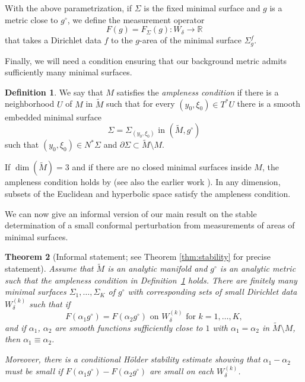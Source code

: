 \documentclass[11pt]{amsart}
\newtheorem{Theorem}{Theorem}[section]
\theoremstyle{definition}
\newtheorem{Definition}[Theorem]{Definition}
\numberwithin{equation}{section}
\newcommand{\mR}{\mathbb{R}}                    %
\newcommand{\p}{\partial}
\begin{document}
With the above parametrization, if $\Sigma$ is the fixed minimal surface and ${g}$ is a metric close to ${g}^{\circ}$, we define the measurement operator 
\begin{equation} \label{intro_f_def}
F({g}) = F_{\Sigma}({g}): W_{\delta} \to \mR
\end{equation}
that takes a Dirichlet data $f$ to the $g$-area of the minimal surface $\Sigma_{{g}}^f$.

Finally, we will need a condition ensuring that our background metric admits sufficiently many minimal surfaces.

\begin{Definition}\label{def:ampleness}
We say that $M$ satisfies the \emph{ampleness condition} if there is a neighborhood $U$ of $M$ in $\widetilde{M}$ such that for every $(y_0,\xi_0) \in T^\ast U$ there is a smooth embedded minimal surface
$$\Sigma=\Sigma_{(y_0,\xi_0)} \text{ in $(\widetilde{M},{g}^\circ)$}$$ 
such that $(y_0,\xi_0) \in N^\ast\Sigma$ and $\p \Sigma \subset \widetilde{M} \setminus M$.
\end{Definition}

If $\dim(\widetilde{M}) = 3$ and if there are no closed minimal surfaces inside $M$, the ampleness condition holds by \cite{mazet2022minimal} (see also the earlier work \cite{zbMATH06945887}). In any dimension, subsets of the Euclidean and hyperbolic space satisfy the ampleness condition.

We can now give an informal version of our main result on the stable determination of a small conformal perturbation from measurements of areas of minimal surfaces.

\begin{Theorem}[Informal statement; see Theorem \ref{thm:stability} for precise statement] \label{thm:rigidity_intro}
	Assume that $\widetilde M$ is an analytic manifold and ${g}^{\circ}$ is an analytic metric such that the ampleness condition in Definition~\ref{def:ampleness} holds. There are finitely many minimal surfaces $\Sigma_1, \ldots, \Sigma_K$ of $g^\circ$ with corresponding sets of small Dirichlet data $W_{\delta}^{(k)}$ such that if 
    \[
    F(\alpha_1 {g}^{\circ}) = F(\alpha_2 {g}^{\circ}) \text{ on $W_{\delta}^{(k)}$ for $k=1,\ldots, K$},
    \]
    and if $\alpha_1$, $\alpha_2$ are smooth functions sufficiently close to $1$ with $\alpha_1 = \alpha_2$ in $\widetilde{M} \setminus M$, then $\alpha_1 \equiv \alpha_2$.
    
    Moreover, there is a conditional H\"older stability estimate showing that $\alpha_1-\alpha_2$ must be small if $F(\alpha_1 {g}^{\circ}) - F(\alpha_2 {g}^{\circ})$ are small on each $W_{\delta}^{(k)}$.
\end{Theorem}
\end{document}

